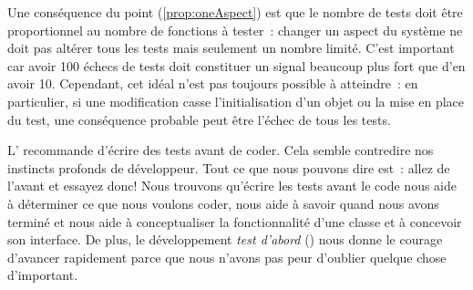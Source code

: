 \documentclass[a4paper,10pt,twoside]{book}
\begin{document}
Une conséquence du point (\ref{prop:oneAspect}) est que le nombre de tests doit être proportionnel au nombre de fonctions à tester~: changer un aspect du système ne doit pas altérer tous les tests mais seulement un nombre limité. C'est important car avoir 100 échecs de tests doit constituer un signal beaucoup plus fort que d'en avoir 10. Cependant, cet idéal n'est pas toujours possible à atteindre~: en particulier, si une modification casse l'initialisation d'un objet ou la mise en place du test, une conséquence probable peut être l'échec de tous les tests.

L' recommande d'écrire des tests avant de
coder. Cela semble contredire nos instincts profonds de
développeur. Tout ce que nous pouvons dire est~: allez de l'avant et
essayez donc! Nous trouvons qu'écrire les tests avant le code nous aide à déterminer ce que nous voulons coder, nous aide à savoir quand nous avons terminé et nous aide à conceptualiser la fonctionnalité d'une classe et à concevoir son interface.
De plus, le développement \flqq{}\emph{test d'abord}\frqq{} () nous donne le courage d'avancer rapidement parce que nous n'avons pas peur d'oublier quelque chose d'important. 

\end{document}
